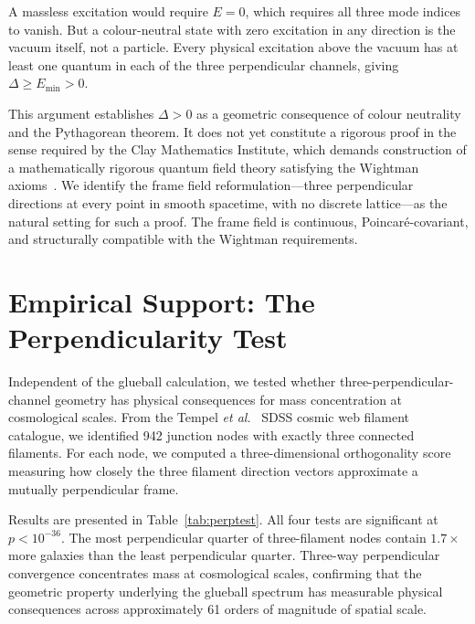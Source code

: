 \documentclass[aps,prd,twocolumn,superscriptaddress,nofootinbib]{revtex4-2}
\begin{document}
A massless excitation would require $E = 0$, which requires all
three mode indices to vanish. But a colour-neutral state with zero
excitation in any direction is the vacuum itself, not a particle.
Every physical excitation above the vacuum has at least one quantum in
each of the three perpendicular channels, giving
$\Delta \geq E_{\text{min}} > 0$.

This argument establishes $\Delta > 0$ as a geometric consequence of
colour neutrality and the Pythagorean theorem. It does not yet
constitute a rigorous proof in the sense required by the Clay
Mathematics Institute, which demands construction of a mathematically
rigorous quantum field theory satisfying the Wightman
axioms~\cite{Jaffe2000}. We identify the frame field
reformulation---three perpendicular directions at every point in
smooth spacetime, with no discrete lattice---as the natural setting
for such a proof. The frame field is continuous, Poincar\'{e}-covariant,
and structurally compatible with the Wightman requirements.

\section{Empirical Support: The Perpendicularity Test}
\label{sec:perptest}

Independent of the glueball calculation, we tested whether
three-perpendicular-channel geometry has physical consequences for
mass concentration at cosmological scales. From the Tempel
\textit{et al.}~\cite{Tempel2014} SDSS cosmic web filament catalogue,
we identified 942 junction nodes with exactly three connected
filaments. For each node, we computed a three-dimensional
orthogonality score measuring how closely the three filament direction
vectors approximate a mutually perpendicular frame.

Results are presented in Table~\ref{tab:perptest}. All four tests are
significant at $p < 10^{-36}$. The most perpendicular quarter of
three-filament nodes contain $1.7\times$ more galaxies than the least
perpendicular quarter. Three-way perpendicular convergence
concentrates mass at cosmological scales, confirming that the
geometric property underlying the glueball spectrum has measurable
physical consequences across approximately 61 orders of magnitude of
spatial scale.
\end{document}
